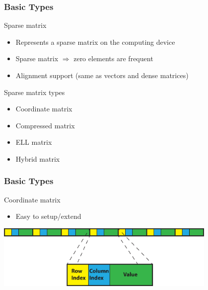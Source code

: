\begin{frame}
\frametitle{Basic Types}

\begin{block}{Sparse matrix}
  \begin{itemize}
   \item Represents a sparse matrix on the computing device
   \item Sparse matrix $\Rightarrow$ zero elements are frequent
   \item Alignment support (same as vectors and dense matrices)
  \end{itemize}
\end{block}


\begin{block}{Sparse matrix types}
  \begin{itemize}
   \item Coordinate matrix
   \item Compressed matrix
   \item ELL matrix
   \item Hybrid matrix
  \end{itemize}
\end{block}

\end{frame}



\begin{frame}
\frametitle{Basic Types}

\begin{block}{Coordinate matrix}
  \begin{itemize}
   \item Easy to setup/extend
  \end{itemize}
  
  \includegraphics[width=0.8\textwidth]{figs/coordinate_matrix.eps}
\end{block}

\end{frame}



